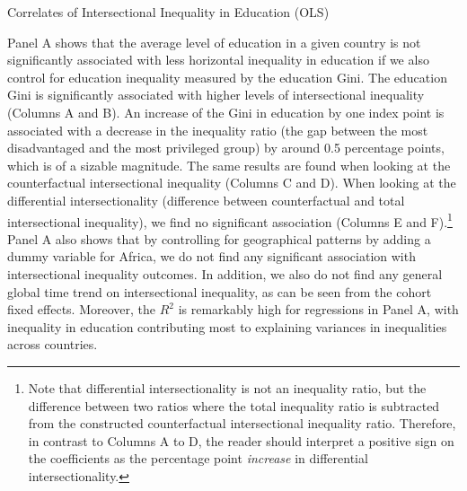 \begin{table}
\caption{Correlates of Intersectional Inequality in Education (OLS)\label{tab:ratios}}
\centering
\resizebox{\linewidth}{!}{
}
\end{table}

Panel A shows that the average level of education in a given country is not significantly associated with less horizontal inequality in education if we also control for education inequality measured by the education Gini. The education Gini is significantly associated with higher levels of intersectional inequality (Columns A and B). An increase of the Gini in education by one index point is associated with a decrease in the inequality ratio (the gap between the most disadvantaged and the most privileged group) by around 0.5 percentage points, which is of a sizable magnitude. The same results are found when looking at the counterfactual intersectional inequality (Columns C and D). When looking at the differential intersectionality (difference between counterfactual and total intersectional inequality), we find no significant association (Columns E and F).\footnote{Note that differential intersectionality is not an inequality ratio, but the difference between two ratios where the total inequality ratio is subtracted from the constructed counterfactual intersectional inequality ratio. Therefore, in contrast to Columns A to D, the reader should interpret a positive sign on the coefficients as the percentage point \textit{increase} in differential intersectionality.} Panel A also shows that by controlling for geographical patterns by adding a dummy variable for Africa, we do not find any significant association with intersectional inequality outcomes. In addition, we also do not find any general global time trend on intersectional inequality, as can be seen from the cohort fixed effects. Moreover, the $R^2$ is remarkably high for regressions in Panel A, with inequality in education contributing most to explaining variances in inequalities across countries. 

